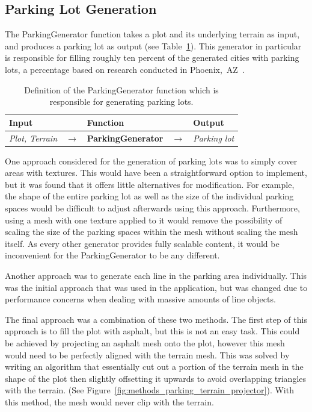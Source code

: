 \subsection{Parking Lot Generation}
The ParkingGenerator function takes a plot and its underlying terrain as input, and produces a parking lot as output (see Table~\ref{table:parking}).
This generator in particular is responsible for filling roughly ten percent of the generated cities with parking lots, a percentage based on research conducted in Phoenix,~AZ~\cite{parking_percent}.

\begin{table}[H]
   \centering
   \begin{tabular}{lllll}
     \textbf{Input}                           &               & \textbf{Function}            &               & \textbf{Output}         \\
     \midrule
     \textit{Plot, Terrain}                   & $\rightarrow$ & \textbf{ParkingGenerator}       & $\rightarrow$ & \textit{Parking lot}           \\
     \bottomrule
   \end{tabular}

   \caption{Definition of the ParkingGenerator function which is responsible for generating parking lots.}
   \label{table:parking}
 \end{table}
 \vspace{-0.4cm}

One approach considered for the generation of parking lots was to simply cover areas with textures.
This would have been a straightforward option to implement, but it was found that it offers little alternatives for modification.
For example, the shape of the entire parking lot as well as the size of the individual parking spaces would be difficult to adjust afterwards using this approach.
Furthermore, using a mesh with one texture applied to it would remove the possibility of scaling the size of the parking spaces within the mesh without scaling the mesh itself.
As every other generator provides fully scalable content, it would be inconvenient for the ParkingGenerator to be any different.

Another approach was to generate each line in the parking area individually. 
This was the initial approach that was used in the application, but was changed due to performance concerns when dealing with massive amounts of line objects.

The final approach was a combination of these two methods.
The first step of this approach is to fill the plot with asphalt, but this is not an easy task.
This could be achieved by projecting an asphalt mesh onto the plot, however this mesh would need to be perfectly aligned with the terrain mesh.
This was solved by writing an algorithm that essentially cut out a portion of the terrain mesh in the shape of the plot then slightly offsetting it upwards to avoid overlapping triangles with the terrain. (See Figure~\ref{fig:methods_parking_terrain_projector}).
With this method, the mesh would never clip with the terrain.

